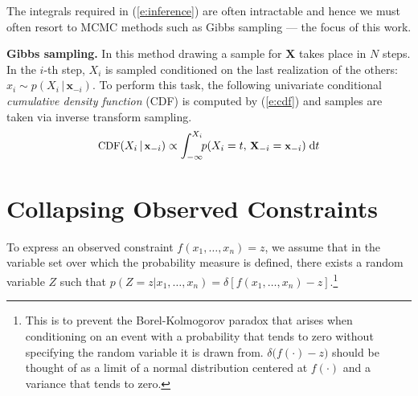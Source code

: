 \documentclass[letterpaper]{article}
\newcommand{\bvec}[1]{\textbf{#1}}
\newcommand{\pr}{p}
\newcommand{\dd}{\;\mathrm{d}} %
\begin{document}
The integrals required in 
(\ref{e:inference}) 
are often intractable and hence we must often resort to MCMC methods
such as Gibbs sampling \cite{geman1984stochastic} --- the focus of this work.

\noindent
{\bf Gibbs sampling.}
 In this method drawing a sample for $\bvec{X}$ takes place in $N$ steps.
In the $i$-th step, $X_i$ is sampled conditioned on the last realization of the others:
$x_i \sim \pr(X_i \,|\, \bvec{x}_{-i})$. 
To perform this task, the following univariate conditional \emph{cumulative density function} (CDF)
is computed by (\ref{e:cdf}) and samples are taken via inverse transform sampling. 
\begin{equation} \footnotesize
\label{e:cdf}
\text{CDF}(X_i  \,|\, \bvec{x}_{-i}) 
\propto
\int_{-\infty}^{X_i} \!\! \pr(X_i = t, \,\bvec{X}_{-i} = \bvec{x}_{-i})  \dd  t
\end{equation} 



\section{Collapsing Observed Constraints}\label{sect:determinism}

To express an observed constraint $f(x_1, \ldots, x_n) = z$, we assume that
in the variable set over which the probability measure is defined, there exists 
a random variable $Z$ such that $\pr(Z=z | x_1, \ldots, x_n) = \delta[f(x_1, \ldots, x_n) - z]$.\footnote{
This is to prevent the Borel-Kolmogorov paradox \cite{kolmogorov1950foundations}
that arises when conditioning on an event with a probability that tends to zero 
without specifying the random variable it is drawn from. %
$\delta\big( f(\cdot) - z\big)$ should be thought of as a limit of a normal distribution centered at $f(\cdot)$ and a variance that tends to zero.
} 
\end{document}
